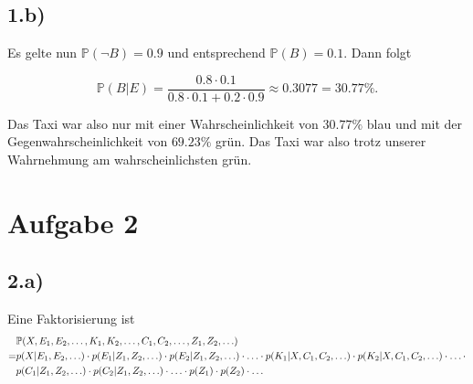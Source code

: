 \documentclass[a4paper]{article}
\newcommand{\IP}{\mathbb{P}}
\begin{document}
\subsection*{1.b)}
Es gelte nun $\IP(\neg B)=0.9$ und entsprechend $\IP(B)=0.1$. Dann folgt

\begin{displaymath}
	\IP(B|E) = \frac{0.8 \cdot 0.1}{0.8 \cdot 0.1 + 0.2 \cdot 0.9} \approx 0.3077 = 30.77\%.
\end{displaymath}

Das Taxi war also nur mit einer Wahrscheinlichkeit von $30.77\%$ blau und mit der Gegenwahrscheinlichkeit von $69.23\%$ gr\"un. Das Taxi war also trotz unserer Wahrnehmung am wahrscheinlichsten gr\"un.

\section*{Aufgabe 2}

\subsection*{2.a)}
Eine Faktorisierung ist
\begin{align}
	 & \IP(X,E_1,E_2,\ldots,K_1,K_2,\ldots,C_1,C_2,\ldots,Z_1,Z_2,\ldots) \notag \\
	=& p(X|E_1,E_2,\ldots) \cdot p(E_1|Z_1,Z_2,\ldots) \cdot p(E_2|Z_1,Z_2,\ldots) \cdot \ldots \cdot p(K_1|X,C_1,C_2,\ldots) \cdot p(K_2|X,C_1,C_2,\ldots) \cdot \ldots \cdot \notag \\
	 & p(C_1|Z_1,Z_2,\ldots) \cdot p(C_2|Z_1,Z_2,\ldots) \cdot \ldots \cdot p(Z_1) \cdot p(Z_2) \cdot \ldots         \notag
\end{align}
\end{document}
